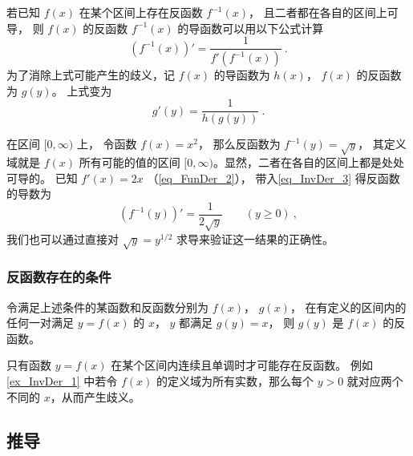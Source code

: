 

若已知 $f(x)$ 在某个区间上存在反函数 $f^{-1}(x)$， 且二者都在各自的区间上可导， 则 $f(x)$ 的反函数 $f^{-1}(x)$ 的导函数可以用以下公式计算
\begin{equation}\label{eq_InvDer_3}
(f^{-1}(x))' = \frac{1}{f'(f^{-1}(x))} ~.
\end{equation} 
为了消除上式可能产生的歧义，记 $f(x)$ 的导函数为 $h(x)$，  $f(x)$ 的反函数为 $g(y)$。 上式变为
 \begin{equation}
g'(y) = \frac{1}{h(g(y))}~.
\end{equation}

\begin{example}{}\label{ex_InvDer_1}
在区间 $[0, \infty)$ 上， 令函数 $f(x) = x^2$， 那么反函数为 $f^{-1}(y) = \sqrt{y}$， 其定义域就是 $f(x)$ 所有可能的值的区间 $[0, \infty)$。显然，二者在各自的区间上都是处处可导的。 已知 $f'(x) = 2x$ （\autoref{eq_FunDer_2}）， 带入\autoref{eq_InvDer_3} 得反函数的导数为
\begin{equation}
(f^{-1}(y))' = \frac{1}{2\sqrt{y}} \qquad (y \ge 0)~,
\end{equation}
我们也可以通过直接对 $\sqrt{y} = y^{1/2}$ 求导来验证这一结果的正确性。
\end{example}

\subsubsection{反函数存在的条件}
令满足上述条件的某函数和反函数分别为 $f(x)$，  $g(x)$， 在有定义的区间内的任何一对满足 $y = f(x)$ 的 $x$，  $y$ 都满足 $g(y) = x$， 则 $g(y)$ 是 $f(x)$ 的反函数。

只有函数 $y = f(x)$ 在某个区间内连续且单调时才可能存在反函数。 例如\autoref{ex_InvDer_1} 中若令 $f(x)$ 的定义域为所有实数，那么每个 $y > 0$  就对应两个不同的 $x$，从而产生歧义。

\subsection{推导}


